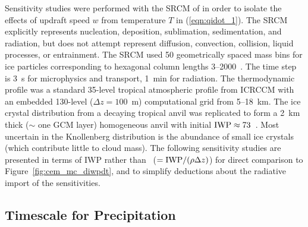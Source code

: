 \documentclass[twoside,agums]{aguplus}
\begin{document}
Sensitivity studies were performed with the SRCM of \cite{ZeK94} in
order to isolate the effects of updraft speed $w$ from temperature
$T$ in (\ref{eqn:qidot_1}).
The SRCM explicitly represents nucleation, deposition, sublimation,
sedimentation, and radiation, but does not attempt represent
diffusion, convection, collision, liquid processes, or entrainment.   
The SRCM used 50 geometrically spaced mass bins for ice particles
corresponding to hexagonal column lengths 3--2000~\um.  
The time step is 3~s for microphysics and transport, 1~min for
radiation.
The thermodynamic profile was a standard 35-level tropical
atmospheric profile from ICRCCM \cite[]{EEF91} with an embedded
130-level ($\Delta z = 100$~m) computational grid from 5--18~km.
The ice crystal distribution from a decaying tropical anvil
\cite[]{KKW93} was replicated to form a 2~km thick ($\sim$ one
GCM layer) homogeneous anvil with initial $\mbox{\textrm{IWP}} \approx 73$~\gxmS. 
Most uncertain in the Knollenberg distribution is the abundance of
small ice crystals (which contribute little to cloud mass). 
The following sensitivity studies are presented in terms of IWP
rather than \qi\ ($= \mbox{\textrm{IWP}}/(\rho \Delta z)$) for direct
comparison to Figure~\ref{fig:cem_mc_diwpdt}, and to simplify
deductions about the radiative import of the sensitivities.

\subsection{Timescale for Precipitation}
\end{document}
